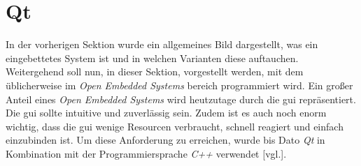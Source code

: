 \section{Qt}
\label{sec:qt}
In der vorherigen Sektion wurde ein allgemeines Bild dargestellt, was ein eingebettetes System
ist und in welchen Varianten diese auftauchen. Weitergehend soll nun, in dieser Sektion,
vorgestellt werden, mit dem üblicherweise im \emph{Open Embedded Systems} bereich programmiert wird.
\newline
\newline
Ein großer Anteil eines \emph{Open Embedded Systems} wird heutzutage durch die \ac{gui}
repräsentiert. Die \ac{gui} sollte intuitive und zuverlässig sein.
Zudem ist es auch noch enorm wichtig, dass die \ac{gui} wenige Resourcen verbraucht, schnell
reagiert und einfach einzubinden ist. Um diese Anforderung zu erreichen, wurde bis Dato \emph{Qt} in
Kombination mit der Programmiersprache \emph{C++} verwendet \cite{QtOnEmbeddedLinux}[vgl.].





%